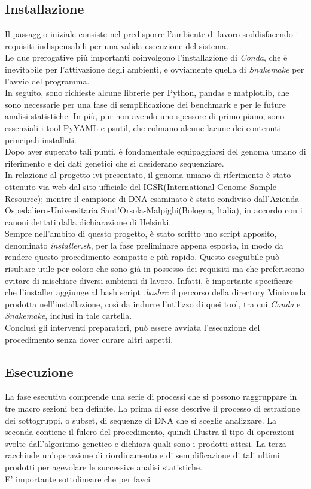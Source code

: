 \subsection{Installazione}
Il passaggio iniziale consiste nel predisporre l'ambiente di lavoro soddisfacendo i requisiti indispensabili per una valida esecuzione del sistema. \\
Le due prerogative più importanti coinvolgono l'installazione di \textit{Conda}, che è inevitabile per l'attivazione degli ambienti, e ovviamente quella di \textit{Snakemake} per l'avvio del programma. \\
In seguito, sono richieste alcune librerie per Python, pandas e matplotlib, che sono necessarie per una fase di semplificazione dei benchmark e per le future analisi statistiche. In più, pur non avendo uno spessore di primo piano, sono essenziali i tool PyYAML e psutil, che colmano alcune lacune dei contenuti principali installati. \\
Dopo aver superato tali punti, è fondamentale equipaggiarsi del genoma umano di riferimento e dei dati genetici che si desiderano sequenziare. \\
In relazione al progetto ivi presentato, il genoma umano di riferimento è stato ottenuto via web dal sito ufficiale del IGSR(International Genome Sample Resource); mentre il campione di DNA esaminato è stato condiviso dall'Azienda Ospedaliero-Universitaria Sant'Orsola-Malpighi(Bologna, Italia), in accordo con i canoni dettati dalla dichiarazione di Helsinki.\\
Sempre nell'ambito di questo progetto, è stato scritto uno script apposito, denominato \textit{installer.sh}, per la fase preliminare appena esposta, in modo da rendere questo procedimento compatto e più rapido. Questo eseguibile può risultare utile per coloro che sono già in possesso dei requisiti ma che preferiscono evitare di mischiare diversi ambienti di lavoro. Infatti, è importante specificare che l'installer aggiunge al bash script \textit{.bashrc} il percorso della directory Miniconda prodotta nell'installazione, così da indurre l'utilizzo di quei tool, tra cui \textit{Conda} e \textit{Snakemake}, inclusi in tale cartella.\\
Conclusi gli interventi preparatori, può essere avviata l'esecuzione del procedimento senza dover curare altri aspetti. 
 
\subsection{Esecuzione}
La fase esecutiva comprende una serie di processi che si possono raggruppare in tre macro sezioni ben definite. La prima di esse descrive il processo di estrazione dei sottogruppi, o subset, di sequenze di DNA che si sceglie analizzare. La seconda contiene il fulcro del procedimento, quindi illustra il tipo di operazioni svolte dall'algoritmo genetico e dichiara quali sono i prodotti attesi. La terza racchiude un'operazione di riordinamento e di semplificazione di tali ultimi prodotti per agevolare le successive analisi statistiche. \\
E' importante sottolineare che per favci

